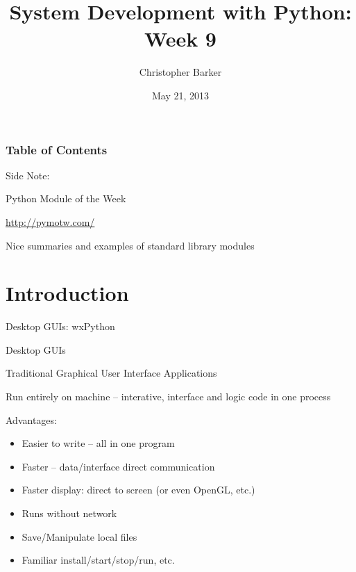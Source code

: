 \documentclass{beamer}
\title[Python Certificate: System Development]{System Development with Python: Week 9}
\author{Christopher Barker}
\institute{UW Continuing Education}
\date{May 21, 2013}
\begin{document}
\begin{frame}
  \titlepage
\end{frame}

\begin{frame}
\frametitle{Table of Contents}
  \tableofcontents
\end{frame}


\begin{frame}[fragile]{Side Note:}

{\LARGE Python Module of the Week}

\vfill
{\Large \url{http://pymotw.com/} }

\vfill
{\Large Nice summaries and examples of standard library modules}


\end{frame} 


\section{Introduction}

\begin{frame}[fragile]{Desktop GUIs: wxPython}

{\Large Desktop GUIs}

\vfill
{\large Traditional Graphical User Interface Applications}

\vfill
{\large Run entirely on machine -- interative, interface and logic code in one process}

\vfill

{\large Advantages:}
\begin{itemize}
   \item Easier to write -- all in one program
   \item Faster -- data/interface direct communication
   \item Faster display: direct to screen (or even OpenGL, etc.)
   \item Runs without network
   \item Save/Manipulate local files
   \item Familiar install/start/stop/run, etc. 
\end{itemize}


\end{frame} 
\end{document}
